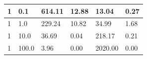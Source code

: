 \documentclass[12pt,a4paper]{report}
\begin{document}
\begin{table}[H]
\begin{tabular}{|l|l|l|l|l|l|}
1                                                                                               & 0.1                                                                                                                    & 614.11                                                                                                                                     & 12.88                                                                                                                             & 13.04                                                                                                 & 0.27                                                                                                                                    \\ \hline
1                                                                                               & 1.0                                                                                                                    & 229.24                                                                                                                                     & 10.82                                                                                                                             & 34.99                                                                                                 & 1.68                                                                                                                                    \\ \hline
1                                                                                               & 10.0                                                                                                                   & 36.69                                                                                                                                      & 0.04                                                                                                                              & 218.17                                                                                                & 0.21                                                                                                                                    \\ \hline
1                                                                                               & 100.0                                                                                                                  & 3.96                                                                                                                                       & 0.00                                                                                                                              & 2020.00                                                                                               & 0.00                                                                                                                                    \\ \hline

\end{tabular}
\end{table}
\end{document}
